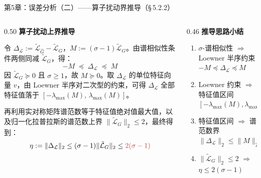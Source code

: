 \documentclass[aspectratio=169,9pt,xcolor=dvipsnames]{beamer}
\newcommand{\highlight}[1]{\textcolor{myred}{\textbf{#1}}}
\newcommand{\blue}[1]{\textcolor{mynavy}{#1}}
\begin{document}
\begin{frame}{第5章：误差分析（二）——算子扰动界推导（§\,5.2.2）}
  \begin{columns}[T]
    \begin{column}{0.50\textwidth}
      \textbf{\blue{算子扰动上界推导}}

      令 $\Delta_{\mathcal{L}} := \tilde{\mathcal{L}}_{\hat{G}} - \tilde{\mathcal{L}}_G$，$M := (\sigma-1)\tilde{\mathcal{L}}_G$。由谱相似性条件两侧同减 $\tilde{\mathcal{L}}_G$，得：
      \begin{equation*}
        -M \;\preceq\; \Delta_{\mathcal{L}} \;\preceq\; M
      \end{equation*}
      因 $\tilde{\mathcal{L}}_G\succeq 0$ 且 $\sigma\ge 1$，故 $M\succeq 0$。取 $\Delta_{\mathcal{L}}$ 的单位特征向量 $v$，由 Loewner 半序对二次型的约束，可得 $\Delta_{\mathcal{L}}$ 全部特征值落于 $[-\lambda_{\max}(M),\,\lambda_{\max}(M)]$。

      \vspace{0.2cm}
      再利用实对称矩阵谱范数等于特征值绝对值最大值，以及归一化拉普拉斯的谱范数上界 $\|\tilde{\mathcal{L}}_G\|_2\le 2$，最终得到：
      \begin{equation*}
        \eta
        := \|\Delta_{\mathcal{L}}\|_2
        \le (\sigma-1)\|\tilde{\mathcal{L}}_G\|_2
        \le {\color{myred}2(\sigma-1)}
      \end{equation*}
    \end{column}

    \begin{column}{0.46\textwidth}
      \textbf{推导思路小结}
      \begin{enumerate}\setlength{\itemsep}{6pt}
        \item $\sigma$-谱相似性 $\Rightarrow$ Loewner 半序约束 $-M\preceq\Delta_{\mathcal{L}}\preceq M$
        \item Loewner 约束 $\Rightarrow$ 特征值区间 $[-\lambda_{\max}(M),\lambda_{\max}(M)]$
        \item 特征值区间 $\Rightarrow$ 谱范数界 $\|\Delta_{\mathcal{L}}\|_2\le\|M\|_2$
        \item $\|\tilde{\mathcal{L}}_G\|_2\le 2$ $\Rightarrow$ \highlight{$\eta\le 2(\sigma-1)$}
      \end{enumerate}
    \end{column}
  \end{columns}
\end{frame}
\end{document}
